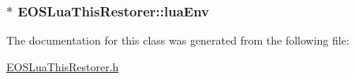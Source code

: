 \hypertarget{classEOSLuaThisRestorer_97a1c3bec2094802ad9976b63ec6269f}{
\subsubsection[{luaEnv}]{$\ast$ {\bf EOSLuaThisRestorer::luaEnv}}}
\label{classEOSLuaThisRestorer_97a1c3bec2094802ad9976b63ec6269f}




The documentation for this class was generated from the following file:\begin{CompactItemize}
\item 
\hyperlink{EOSLuaThisRestorer_8h}{EOSLuaThisRestorer.h}\end{CompactItemize}
